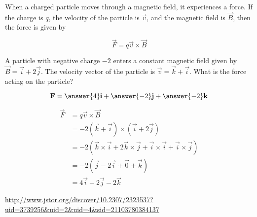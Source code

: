 \documentclass{ximera}
\begin{document}
When a charged particle moves through a magnetic field, it experiences a force.  If the charge is $q$, the velocity of the particle is $\vec{v}$, and the magnetic field is $\vec{B}$, then the force is given by

\[
\vec{F} = q\vec{v} \times \vec{B}
\]

\begin{question}
	A particle with negative charge $-2$ enters a constant magnetic field given by $\vec{B} = \vec{i}+2\vec{j}$.  The velocity vector of the particle is  $\vec{v} = \vec{k}+\vec{i}$.  What is the force acting on the particle?
	
	\[
	\vec{F} = \answer{4}\vec{i}+\answer{-2}\vec{j}+\answer{-2}\vec{k}
	\]
	
	\begin{hint}
		\begin{align*}
			\vec{F} &= q\vec{v} \times \vec{B}\\
				&= -2 ( \vec{k}+\vec{i}) \times (\vec{i}+2\vec{j})\\
				&=-2( \vec{k} \times \vec{i}+2\vec{k} \times \vec{j}+\vec{i} \times \vec{i}+\vec{i} \times \vec{j})\\
				&=-2(\vec{j}-2\vec{i}+\vec{0}+\vec{k})\\
				&=4\vec{i}-2\vec{j}-2\vec{k}
		\end{align*}
	\end{hint}
\end{question}





\url{http://www.jstor.org/discover/10.2307/2323537?uid=3739256&uid=2&uid=4&sid=21103780384137}
\end{document}
